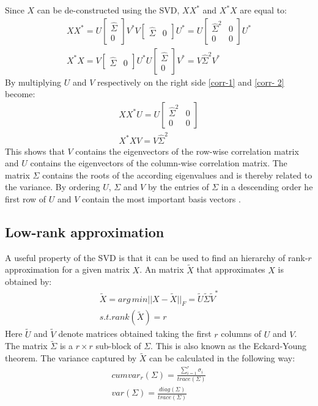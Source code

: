 Since \(X\) can be de-constructed using the SVD, \(XX^{*}\) and \(X^{*}X\) are equal to:
\begin{gather}
XX^{*} = U\begin{bmatrix}
\hat{\Sigma} \\
0
\end{bmatrix}V^{*}V\begin{bmatrix}
\hat{\Sigma} & 0
\end{bmatrix}U^{*} = U \begin{bmatrix}
\hat{\Sigma}^{2} & 0 \\
0 & 0
\end{bmatrix} U^{*} \label{corr-1}\\
X^{*}X = V \begin{bmatrix}
\hat{\Sigma} & 0
\end{bmatrix} U^{*}U \begin{bmatrix}
\hat{\Sigma} \\
0
\end{bmatrix} V^{*} = V\hat{\Sigma}^{2}V^{*} \label{corr- 2}
\end{gather}
By multiplying \(U\) and \(V\) respectively on the right side \ref{corr-1} and \ref{corr- 2} become:
\begin{gather}
XX^{*}U = U \begin{bmatrix}
\hat{\Sigma}^{2} & 0 \\
0 & 0
\end{bmatrix} \\
X^{*}XV = V\hat{\Sigma}^{2}
\end{gather}
This shows that \(V\) contains the eigenvectors of the row-wise correlation matrix and \(U\) contains the eigenvectors of the column-wise correlation matrix.
The matrix \(\Sigma\) contains the roots of the according eigenvalues and is thereby related to the variance.
By ordering \(U\), \(\Sigma\) and \(V\) by the entries of \(\Sigma\) in a descending order he first row of \(U\) and \(V\) contain the most important basis vectors \cite{brunton_kutz_2019b}.

\subsection{Low-rank approximation}
A useful property of the SVD is that it can be used to find an hierarchy of rank-\(r\) approximation for a given matrix \(X\).
An matrix \(\tilde{X}\) that approximates \(X\) is obtained by:
\begin{gather}
\tilde{X} = arg\,min ||X - \tilde{X}||_F = \tilde{U}\tilde{\Sigma}\tilde{V}^{*}	\\
s.t. rank(\tilde{X}) = r
\end{gather}	
Here  \(\tilde{U}\) and \(\tilde{V}\) denote matrices obtained taking the first \(r\) columns of \(U\) and \(V\). The matrix \(\tilde{\Sigma}\) is a \(r \times r\) sub-block of \(\Sigma\).
This is also known as the Eckard-Young theorem.
The variance captured by \(\tilde{X}\) can be calculated in the following way:
\begin{gather}
cumvar_{r}(\Sigma) = \frac{\sum_{i = 1}^{r} \sigma_i}{trace(\Sigma)} \label{cum-var-r} \\
var(\Sigma) = \frac{diag(\Sigma)}{trace(\Sigma)} \label{var-sig}
\end{gather}
\cite{brunton_kutz_2019b}
